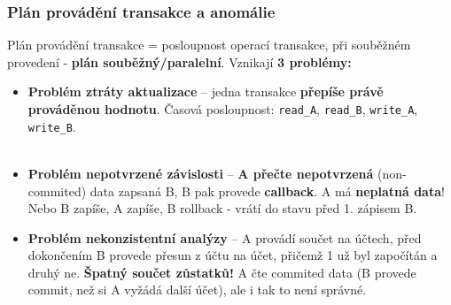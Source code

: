 \subsubsection{Plán provádění transakce a anomálie}
Plán provádění transakce = posloupnost operací transakce, při souběžném provedení - \textbf{plán souběžný/paralelní}. Vznikají \textbf{3 problémy:}
\begin{itemize}
\item \textbf{Problém ztráty aktualizace} -- jedna transakce \textbf{přepíše právě prováděnou hodnotu}. Časová posloupnost: \texttt{read\_A}, \texttt{read\_B}, \texttt{write\_A}, \texttt{write\_B}.
\\\\
\noindent{}
\item \textbf{Problém nepotvrzené závislosti} -- \textbf{A přečte nepotvrzená} (non-commited) data zapsaná B, B pak provede \textbf{callback}. A má \textbf{neplatná data}! Nebo B zapíše, A zapíše, B rollback - vrátí do stavu před 1. zápisem B.
\\
\noindent{}
\item \textbf{Problém nekonzistentní analýzy} -- A provádí součet na účtech, před dokončením B provede přesun z účtu na účet, přičemž 1 už byl započítán a druhý ne. \textbf{Špatný součet zůstatků!} A čte commited data (B provede commit, než si A vyžádá další účet), ale i tak to není správné.
\\\\
\noindent{}
\end{itemize}

